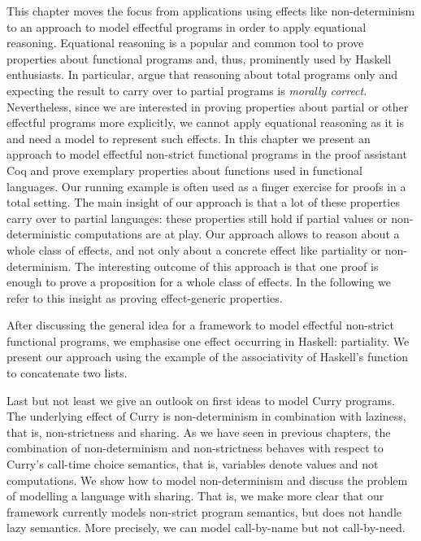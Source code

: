 
This chapter moves the focus from applications using effects like non\--determinism to an approach to model effectful programs in order to apply equational reasoning.
Equational reasoning is a popular and common tool to prove properties about functional programs and, thus, prominently used by Haskell enthusiasts. \citep{jeuring2012testing, gibbons2011just, hutton2008reasoning}
In particular, \citet{danielsson2006fast} argue that reasoning about total programs only and expecting the result to carry over to partial programs is \textit{morally correct}.
Nevertheless, since we are interested in proving properties about partial or other effectful programs more explicitly, we cannot apply equational reasoning as it is and need a model to represent such  effects.
In this chapter we present an approach to model effectful non\--strict functional programs in the proof assistant Coq and prove exemplary properties about functions used in functional languages.
Our running example is often used as a finger exercise for proofs in a total setting.
The main insight of our approach is that a lot of these properties carry over to partial languages: these properties still hold if partial values or non\--deterministic computations are at play.
Our approach allows to reason about a whole class of effects, and not only about a concrete effect like partiality or non\--determinism.
The interesting outcome of this approach is that one proof is enough to prove a proposition for a whole class of effects.
In the following we refer to this insight as proving effect\--generic properties.

After discussing the general idea for a framework to model effectful non\--strict functional programs, we emphasise one effect occurring in Haskell: partiality.
We present our approach using the example of the associativity of Haskell's function  to concatenate two lists.

Last but not least we give an outlook on first ideas to model Curry programs.
The underlying effect of Curry is non\--determinism in combination with laziness, that is, non\--strictness and sharing.
As we have seen in previous chapters, the combination of non\--determinism and non\--strictness behaves with respect to Curry's call\--time choice semantics, that is, variables denote values and not computations.
We show how to model non\--determinism and discuss the problem of modelling a language with sharing.
That is, we make more clear that our framework currently models non\--strict program semantics, but does not handle lazy semantics.
More precisely, we can model call\--by\--name but not call\--by\--need.


